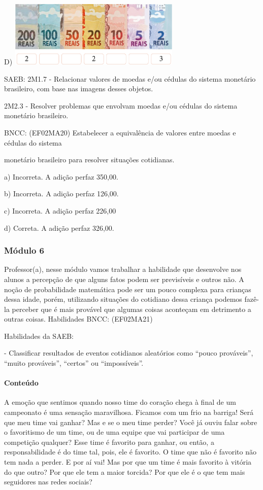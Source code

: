 D) \includegraphics[width=3.23370in,height=1.23958in]{media/image82.png}

SAEB: 2M1.7 - Relacionar valores de moedas e/ou cédulas do sistema
monetário brasileiro, com base nas imagens desses objetos.

2M2.3 - Resolver problemas que envolvam moedas e/ou cédulas do sistema
monetário brasileiro.

BNCC: (EF02MA20) Estabelecer a equivalência de valores entre moedas e
cédulas do sistema

monetário brasileiro para resolver situações cotidianas.

a) Incorreta. A adição perfaz 350,00.

b) Incorreta. A adição perfaz 126,00.

c) Incorreta. A adição perfaz 226,00

d) Correta. A adição perfaz 326,00.

\subsubsection{Módulo 6 }\label{muxf3dulo-6}

Professor(a), nesse módulo vamos trabalhar a habilidade que desenvolve
nos alunos a percepção de que alguns fatos podem ser previsíveis e
outros não. A noção de probabilidade matemática pode ser um pouco
complexa para crianças dessa idade, porém, utilizando situações do
cotidiano dessa criança podemos fazê-la perceber que é mais provável que
algumas coisas aconteçam em detrimento a outras coisas. Habilidades
BNCC: (EF02MA21)

Habilidades da SAEB:

- Classificar resultados de eventos cotidianos aleatórios como ``pouco
prováveis'', ``muito prováveis'', ``certos'' ou ``impossíveis''.

\paragraph{Conteúdo}\label{conteuxfado-5}

A emoção que sentimos quando nosso time do coração chega à final de um
campeonato é uma sensação maravilhosa. Ficamos com um frio na barriga!
Será que meu time vai ganhar? Mas e se o meu time perder? Você já ouviu
falar sobre o favoritismo de um time, ou de uma equipe que vai
participar de uma competição qualquer? Esse time é favorito para ganhar,
ou então, a responsabilidade é do time tal, pois, ele é favorito. O time
que não é favorito não tem nada a perder. E por aí vai! Mas por que um
time é mais favorito à vitória do que outro? Por que ele tem a maior
torcida? Por que ele é o que tem mais seguidores nas redes sociais?

